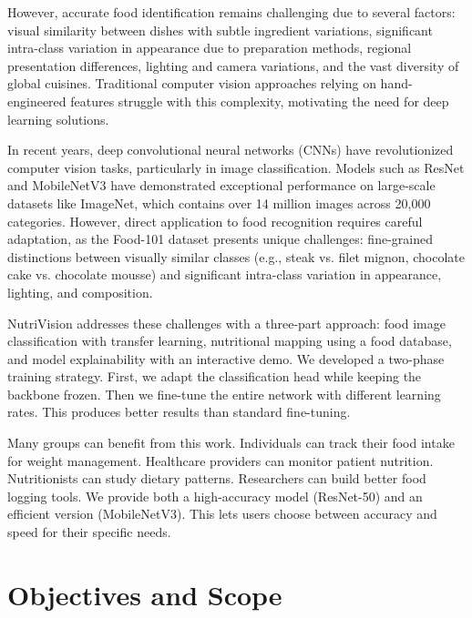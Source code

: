 \documentclass[conference]{IEEEtran}
\begin{document}
However, accurate food identification remains challenging due to several factors: visual similarity between dishes with subtle ingredient variations, significant intra-class variation in appearance due to preparation methods, regional presentation differences, lighting and camera variations, and the vast diversity of global cuisines. Traditional computer vision approaches relying on hand-engineered features struggle with this complexity, motivating the need for deep learning solutions.

In recent years, deep convolutional neural networks (CNNs) have revolutionized computer vision tasks, particularly in image classification. Models such as ResNet \cite{he2016resnet} and MobileNetV3 \cite{howard2019mobilenetv3} have demonstrated exceptional performance on large-scale datasets like ImageNet, which contains over 14 million images across 20,000 categories. However, direct application to food recognition requires careful adaptation, as the Food-101 dataset \cite{bossard2014food101} presents unique challenges: fine-grained distinctions between visually similar classes (e.g., steak vs. filet mignon, chocolate cake vs. chocolate mousse) and significant intra-class variation in appearance, lighting, and composition.

NutriVision addresses these challenges with a three-part approach: food image classification with transfer learning, nutritional mapping using a food database, and model explainability with an interactive demo. We developed a two-phase training strategy. First, we adapt the classification head while keeping the backbone frozen. Then we fine-tune the entire network with different learning rates. This produces better results than standard fine-tuning.

Many groups can benefit from this work. Individuals can track their food intake for weight management. Healthcare providers can monitor patient nutrition. Nutritionists can study dietary patterns. Researchers can build better food logging tools. We provide both a high-accuracy model (ResNet-50) and an efficient version (MobileNetV3). This lets users choose between accuracy and speed for their specific needs.

\section{Objectives and Scope}
\end{document}

